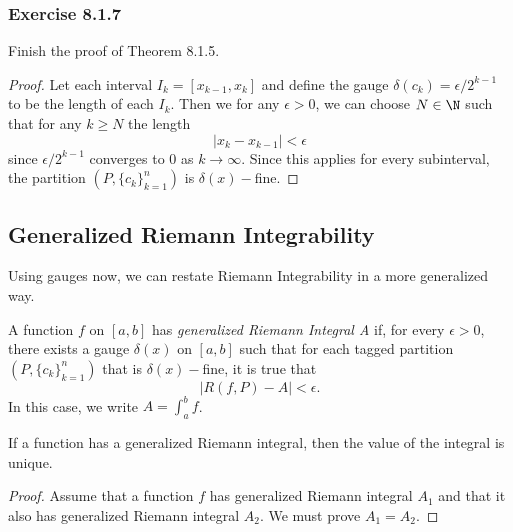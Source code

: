 \subsubsection{Exercise 8.1.7} Finish the proof of Theorem 8.1.5.
\begin{proof}
    Let each interval \( I_{k } = [x_{k-1}, x_{k }] \) and define the gauge \( \delta(c_{k }) =   \epsilon / 2^{k-1}  \) to be the length of each \( I_{k } \). Then we for any \( \epsilon > 0  \), we can choose \( N \in \N  \) such that for any \(  k \geq N  \) the length 
    \[  | x_{k} - x_{k-1}  | < \epsilon \] since \( \epsilon / 2^{k-1}  \) converges to \( 0  \) as \( k \to \infty  \). Since this applies for every subinterval, the partition \( (P, \{ c_{k }  \}_{k=1}^{n}) \) is \( \delta(x)- \)fine.


\end{proof}

\subsection{Generalized Riemann Integrability} 
Using gauges now, we can restate Riemann Integrability in a more generalized way.
\begin{tcolorbox}
\begin{defn}
    A function \( f  \) on \( [a,b]  \) has \textit{generalized Riemann Integral A} if, for every \( \epsilon > 0  \), there exists a gauge \( \delta(x)  \) on \( [a,b]  \) such that for each tagged partition \( (P, \{ c_{k } \}_{k=1}^n) \) that is \( \delta(x)- \)fine, it is true that 
    \[  | R(f,P) - A  | <\epsilon. \] In this case, we write \( A = \int_{ a }^{ b } f \).
\end{defn}
\end{tcolorbox}

\begin{tcolorbox}
\begin{thm}
If a function has a generalized Riemann integral, then the value of the integral is unique.
\end{thm}
\end{tcolorbox}

\begin{proof}
Assume that a function \( f  \) has generalized Riemann integral \( A_{1} \) and that it also has generalized Riemann integral \( A_{2} \). We must prove \( A_{1} = A_{2} \).
\end{proof}

